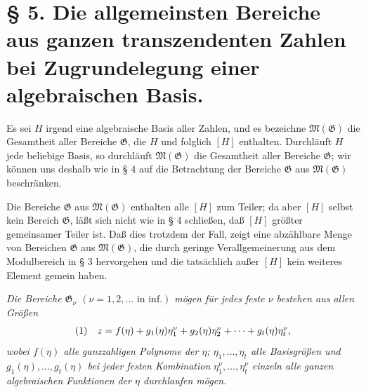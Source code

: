 \section*{§ 5. Die allgemeinsten Bereiche aus ganzen transzendenten Zahlen bei Zugrundelegung einer algebraischen Basis.}

Es sei $H$ irgend eine algebraische Basis aller Zahlen, und es bezeichne
$\mathfrak M(\mathfrak G)$ die Gesamtheit aller Bereiche $\mathfrak G$, die $H$
und folglich $[H]$ enthalten. Durchläuft $H$ jede beliebige Basis, so
durchläuft $\mathfrak M(\mathfrak G)$ die Gesamtheit aller Bereiche
$\mathfrak G$; wir können uns deshalb wie in § 4 auf die Betrachtung der
Bereiche $\mathfrak G$ aus $\mathfrak M(\mathfrak G)$ beschränken.

Die Bereiche $\mathfrak G$ aus $\mathfrak M(\mathfrak G)$ enthalten alle
$[H]$ zum Teiler; da aber $[H]$ selbst kein Bereich $\mathfrak G$, läßt sich
nicht wie in § 4 schließen, daß $[H]$ größter gemeinsamer Teiler ist. Daß dies
trotzdem der Fall, zeigt eine abzählbare Menge von Bereichen $\mathfrak G$ aus
$\mathfrak M(\mathfrak G)$, die durch geringe Verallgemeinerung aus dem
Modulbereich in § 3 hervorgehen und die tatsächlich außer $[H]$ kein weiteres
Element gemein haben.

\emph{Die Bereiche $\mathfrak G_\nu$ $(\nu=1,2,\ldots\text{ in inf.})$ mögen
für jedes feste $\nu$ bestehen aus allen Größen}
\[
\begin{array}{@{}l@{\quad}c@{}}
(1)& z=f(\eta)+g_1(\eta)\eta_1^\nu+g_2(\eta)\eta_2^\nu+\cdots+g_t(\eta)\eta_t^\nu,
\end{array}
\]
\emph{wobei $f(\eta)$ alle ganzzahligen Polynome der $\eta$;
$\eta_1,\ldots,\eta_t$ alle Basisgrößen und $g_1(\eta),\ldots,g_t(\eta)$ bei
jeder festen Kombination $\eta_1^\nu,\ldots,\eta_t^\nu$ einzeln alle ganzen
algebraischen Funktionen der $\eta$ durchlaufen mögen.}

